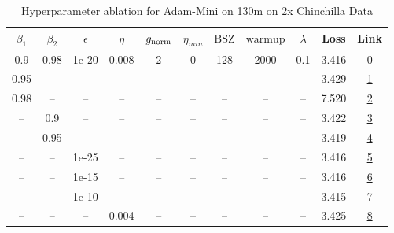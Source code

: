 \begin{table}[H]
\centering
\caption{Hyperparameter ablation for Adam-Mini on 130m on 2x Chinchilla Data}
\label{tab:ablation_adam-mini_130m_on_2x_chinchilla_data}
\begin{tabular}{ccccccccccc}
\toprule
$\beta_1$ & $\beta_2$ & $\epsilon$ & $\eta$ & $g_{\mathrm{norm}}$ & $\eta_{min}$ & $\mathrm{BSZ}$ & $\mathrm{warmup}$ & $\lambda$ & Loss & Link \\
\midrule
0.9 & 0.98 & 1e-20 & 0.008 & 2 & 0 & 128 & 2000 & 0.1 & 3.416 & \href{https://wandb.ai/marin-community/optimizer-scaling/runs/sweep-130m-5B-mini609ad2lr0.008-wd0.1-minlr0-warmup2000-b10.9-b2-b557c0}{0} \\
\midrule
0.95 & -- & -- & -- & -- & -- & -- & -- & -- & 3.429 & \href{https://wandb.ai/marin-community/optimizer-scaling/runs/sweep-130m-5B-mini20b8b1lr0.008-wd0.1-minlr0-warmup2000-b10.95-b-b46cb8}{1} \\
0.98 & -- & -- & -- & -- & -- & -- & -- & -- & 7.520 & \href{https://wandb.ai/marin-community/optimizer-scaling/runs/sweep-130m-5B-minideec58lr0.008-wd0.1-minlr0-warmup2000-b10.98-b-62bc48}{2} \\
-- & 0.9 & -- & -- & -- & -- & -- & -- & -- & 3.422 & \href{https://wandb.ai/marin-community/optimizer-scaling/runs/sweep-130m-5B-minib27e6blr0.008-wd0.1-minlr0-warmup2000-b10.9-b2-04f0b5}{3} \\
-- & 0.95 & -- & -- & -- & -- & -- & -- & -- & 3.419 & \href{https://wandb.ai/marin-community/optimizer-scaling/runs/sweep-130m-5B-mini51a865lr0.008-wd0.1-minlr0-warmup2000-b10.9-b2-856cfa}{4} \\
-- & -- & 1e-25 & -- & -- & -- & -- & -- & -- & 3.416 & \href{https://wandb.ai/marin-community/optimizer-scaling/runs/sweep-130m-5B-mini7d5c8flr0.008-wd0.1-minlr0-warmup2000-b10.9-b2-dd8629}{5} \\
-- & -- & 1e-15 & -- & -- & -- & -- & -- & -- & 3.416 & \href{https://wandb.ai/marin-community/optimizer-scaling/runs/sweep-130m-5B-mini8f577dlr0.008-wd0.1-minlr0-warmup2000-b10.9-b2-361bf6}{6} \\
-- & -- & 1e-10 & -- & -- & -- & -- & -- & -- & 3.415 & \href{https://wandb.ai/marin-community/optimizer-scaling/runs/sweep-130m-5B-minidbb1e7lr0.008-wd0.1-minlr0-warmup2000-b10.9-b2-9d6767}{7} \\
-- & -- & -- & 0.004 & -- & -- & -- & -- & -- & 3.425 & \href{https://wandb.ai/marin-community/optimizer-scaling/runs/sweep-130m-5B-miniab7841lr0.004-wd0.1-minlr0-warmup2000-b10.9-b2-0d5f4f}{8} \\

\end{tabular}
\end{table}
